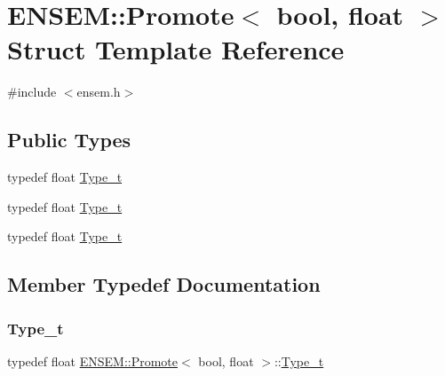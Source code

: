 \hypertarget{structENSEM_1_1Promote_3_01bool_00_01float_01_4}{}\section{E\+N\+S\+EM\+:\+:Promote$<$ bool, float $>$ Struct Template Reference}
\label{structENSEM_1_1Promote_3_01bool_00_01float_01_4}


{\ttfamily \#include $<$ensem.\+h$>$}

\subsection*{Public Types}
\begin{DoxyCompactItemize}
\item 
typedef float \mbox{\hyperlink{structENSEM_1_1Promote_3_01bool_00_01float_01_4_aac75d1edfea4b854f38644f46a79ad71}{Type\+\_\+t}}
\item 
typedef float \mbox{\hyperlink{structENSEM_1_1Promote_3_01bool_00_01float_01_4_aac75d1edfea4b854f38644f46a79ad71}{Type\+\_\+t}}
\item 
typedef float \mbox{\hyperlink{structENSEM_1_1Promote_3_01bool_00_01float_01_4_aac75d1edfea4b854f38644f46a79ad71}{Type\+\_\+t}}
\end{DoxyCompactItemize}


\subsection{Member Typedef Documentation}
\mbox{\label{structENSEM_1_1Promote_3_01bool_00_01float_01_4_aac75d1edfea4b854f38644f46a79ad71}} 
\subsubsection{\texorpdfstring{Type\_t}{Type\_t}\hspace{0.1cm}{\footnotesize\ttfamily [1/3]}}
{\footnotesize\ttfamily typedef float \mbox{\hyperlink{structENSEM_1_1Promote}{E\+N\+S\+E\+M\+::\+Promote}}$<$ bool, float $>$\+::\mbox{\hyperlink{structENSEM_1_1Promote_3_01bool_00_01float_01_4_aac75d1edfea4b854f38644f46a79ad71}{Type\+\_\+t}}}

